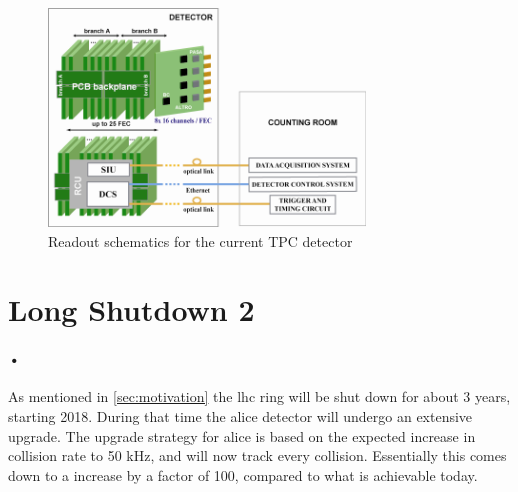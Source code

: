 \documentclass[a4paper]{report}
\begin{document}
\begin{figure}[h!]
  \centering
    \includegraphics[width=0.75\textwidth]{images/altro.png}
     \caption{Readout schematics for the current TPC detector}
    \label{fig:altro}
\end{figure}

\section{Long Shutdown 2}
\paragraph{•}
As mentioned in \ref{sec:motivation} the \gls{lhc} ring will be shut down for about 3 years, starting 2018.
During that time the \gls{alice} detector will undergo an extensive upgrade.
The upgrade strategy for \gls{alice} is based on the expected increase in collision rate to 50 kHz, and will now track every collision.
Essentially this comes down to a increase by a factor of 100, compared to what is achievable today.
\end{document}
